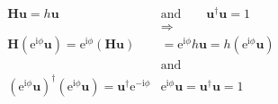 \documentclass{article}
\newcommand{\E}{\ensuremath{\mathrm{e}}}
\newcommand{\I}{\ensuremath{\mathrm{i}}}
\renewcommand{\vec}[1]{\ensuremath{\mathbf{#1}}}
\begin{document}
\begin{align}
  \vec{H}\vec{u}=h\vec{u}
  \qquad&\text{and}\qquad
  \vec{u}^\dagger\vec{u}=1\nonumber\\
  &\Rightarrow\nonumber\nonumber\\
  \vec{H}\left(\E^{\I\phi}\vec{u}\right)
  =\E^{\I\phi}\left(\vec{H}\vec{u}\right)
  &=\E^{\I\phi}h\vec{u}
  =h\left(\E^{\I\phi}\vec{u}\right)\nonumber\\
  &\text{and}\nonumber\nonumber\\
  \left(\E^{\I\phi}\vec{u}\right)^\dagger\left(\E^{\I\phi}\vec{u}\right)
  =\vec{u}^\dagger\E^{-\I\phi}&\E^{\I\phi}\vec{u}
  =\vec{u}^\dagger\vec{u}=1
\nonumber\end{align}
\end{document}
